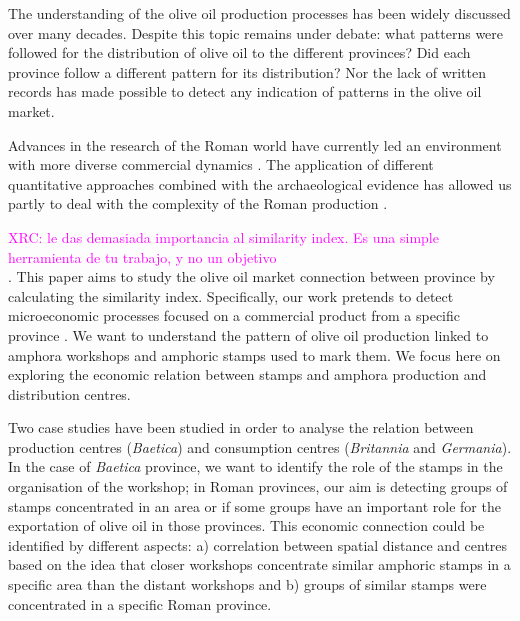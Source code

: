 \documentclass[review]{elsarticle}
\newcommand{\memo}[2]{\textcolor{#1}{#2}}
\newcommand{\xavi}[1]{\memo{magenta}{XRC: #1\\}}
\begin{document}
The understanding of the olive oil production processes has been widely discussed over many decades\citep{rodriguez_economioleicola_1977, Chic_hispania_1997,millet_anforas_1998}. Despite this topic remains under debate: what patterns were followed for the distribution of olive oil to the different provinces?
Did each province follow a different pattern for its distribution? Nor the lack of written records has made possible to detect any indication of patterns in the olive oil market.

Advances in the research of the Roman world have currently led an environment with more diverse commercial dynamics \citep{duncan1982economy,
temin_economy_2006,
quantifyingwilson2009}. The application of different quantitative approaches combined with the archaeological evidence has allowed us partly to deal with the complexity of the Roman production \citep{brughmans_roman_2016,
orengo_seeds_2016,bayesian_2018,
coto-sarmiento_identifying_2018,
rubio-campillo_ecology_2018}.



\xavi{le das demasiada importancia al similarity index. Es una simple herramienta de tu trabajo, y no un objetivo}.
This paper aims to study the olive oil market connection between province by calculating the similarity index. Specifically, our work pretends to detect microeconomic processes focused on a commercial product from a specific province \citep{isaksen_network_2006}. We want to understand the pattern of olive oil production linked to amphora workshops and amphoric stamps used to mark them. We focus here on exploring the economic relation between stamps and amphora production and distribution centres. 

Two case studies have been studied in order to analyse the relation between production centres (\textit{Baetica}) and consumption centres (\textit{Britannia} and \textit{Germania}). In the case of \textit{Baetica} province, we want to identify the role of the stamps in the organisation of the workshop; in Roman provinces, our aim is detecting groups of stamps concentrated in an area or if some groups have an important role for the exportation of olive oil in those provinces. This economic connection could be identified by different aspects: a) correlation between spatial distance and centres based on the idea that closer workshops concentrate similar amphoric stamps in a specific area than the distant workshops and b) groups of similar stamps were concentrated in a specific Roman province. 
\end{document}
